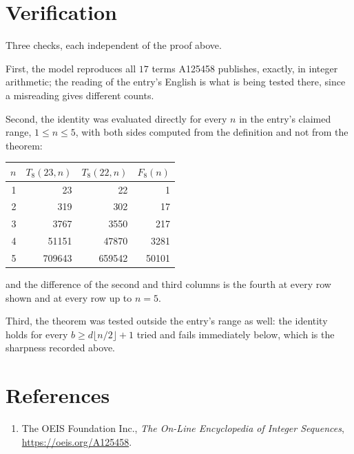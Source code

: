 \documentclass[11pt,a4paper]{article}
\theoremstyle{plain}
\theoremstyle{definition}
\begin{document}
\section{Verification}

Three checks, each independent of the proof above.

First, the model reproduces all $17$ terms A125458 publishes, exactly, in integer
arithmetic; the reading of the entry's English is what is being tested there, since a
misreading gives different counts.

Second, the identity was evaluated directly for every $n$ in the entry's claimed range,
$1\le n\le5$, with both sides computed from the definition and not from the theorem:

\begin{center}
\begin{tabular}{rrrr}
$n$ & $T_{8}(23,n)$ & $T_{8}(22,n)$ & $F_{8}(n)$ \\ \hline
1 & 23 & 22 & 1 \\
2 & 319 & 302 & 17 \\
3 & 3767 & 3550 & 217 \\
4 & 51151 & 47870 & 3281 \\
5 & 709643 & 659542 & 50101 \\
\end{tabular}
\end{center}

\noindent and the difference of the second and third columns is the fourth at every row shown
and at every row up to $n=5$.

Third, the theorem was tested outside the entry's range as well: the identity holds for every
$b\ge d\lfloor n/2\rfloor+1$ tried and fails immediately below, which is the sharpness recorded
above.

\section*{References}
\begin{enumerate}
\item The OEIS Foundation Inc., \emph{The On-Line Encyclopedia of Integer Sequences},
\url{https://oeis.org/A125458}.
\end{enumerate}
\end{document}
